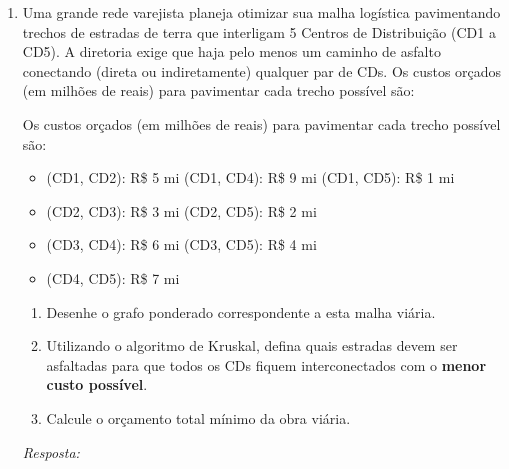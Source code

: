 \documentclass[12pt]{article}
\newcommand{\quadro}[1]{\vspace{0.2cm}\begin{tcolorbox}[colback=white, colframe=black, height=#1, boxrule=0.5pt, arc=0pt] \textit{Resposta:} \end{tcolorbox}}
\begin{document}
\begin{enumerate}[label=\arabic*), leftmargin=1.5cm, itemsep=0.8cm]
\item Uma grande rede varejista planeja otimizar sua malha logística pavimentando trechos de estradas de terra que interligam 5 Centros de Distribuição (CD1 a CD5). A diretoria exige que haja pelo menos um caminho de asfalto conectando (direta ou indiretamente) qualquer par de CDs. Os custos orçados (em milhões de reais) para pavimentar cada trecho possível são:
\begin{center}
\end{center}

Os custos orçados (em milhões de reais) para pavimentar cada trecho possível são:
\begin{itemize}
    \item (CD1, CD2): R\$ 5 mi \qquad (CD1, CD4): R\$ 9 mi \qquad (CD1, CD5): R\$ 1 mi
    \item (CD2, CD3): R\$ 3 mi \qquad (CD2, CD5): R\$ 2 mi
    \item (CD3, CD4): R\$ 6 mi \qquad (CD3, CD5): R\$ 4 mi
    \item (CD4, CD5): R\$ 7 mi
\end{itemize}
\begin{enumerate}[label=\alph*)]
    \item Desenhe o grafo ponderado correspondente a esta malha viária.
    \item Utilizando o algoritmo de Kruskal, defina quais estradas devem ser asfaltadas para que todos os CDs fiquem interconectados com o \textbf{menor custo possível}.
    \item Calcule o orçamento total mínimo da obra viária.
\end{enumerate}
\quadro{8cm}


\end{enumerate}
\end{document}
